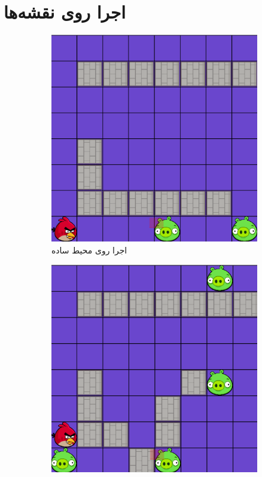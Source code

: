\documentclass[11pt, a4paper, oneside]{article}
\begin{document}
\section{اجرا روی نقشه‌ها}
\begin{figure}
	\centering
	\begin{subfigure}{0.5\textwidth}
		\includegraphics[width=\textwidth]{./images/simple}
		\caption{اجرا روی محیط ساده}
		\label{fig:simplemap}
	\end{subfigure}
\hfill
	\begin{subfigure}{0.5\textwidth}
		\includegraphics[width=\textwidth]{./images/map1}

\end{subfigure}
\end{figure}
\end{document}
